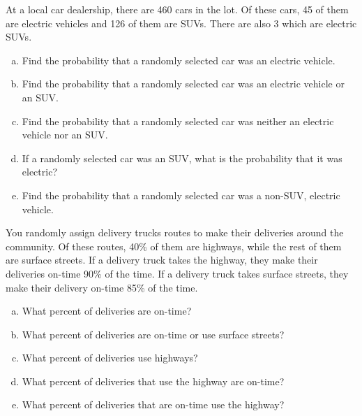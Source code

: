 \documentclass[11pt,letterpaper]{article}
\begin{document}
\newpage



 At a local car dealership, there are 460 cars in the lot. Of these cars, 45 of them are electric vehicles and 126 of them are SUVs. There are also 3 which are electric SUVs. 
	\begin{enumerate}[(a)]
	\item Find the probability that a randomly selected car was an electric vehicle. 
	\item Find the probability that a randomly selected car was an electric vehicle or an SUV.
	\item Find the probability that a randomly selected car was neither an electric vehicle nor an SUV.
	\item If a randomly selected car was an SUV, what is the probability that it was electric? 
	\item Find the probability that a randomly selected car was a non-SUV, electric vehicle. 
	\end{enumerate}



\newpage



 You randomly assign delivery trucks routes to make their deliveries around the community. Of these routes, 40\% of them are highways, while the rest of them are surface streets. If a delivery truck takes the highway, they make their deliveries on-time 90\% of the time. If a delivery truck takes surface streets, they make their delivery on-time 85\% of the time.
	\begin{enumerate}[(a)]
	\item What percent of deliveries are on-time?
	\item What percent of deliveries are on-time or use surface streets?
	\item What percent of deliveries use highways?
	\item What percent of deliveries that use the highway are on-time?
	\item What percent of deliveries that are on-time use the highway?
	\end{enumerate}
\end{document}
